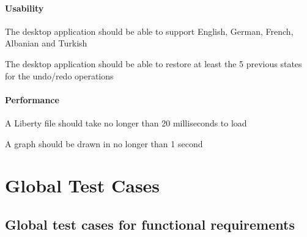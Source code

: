 \documentclass[10pt,a4paper]{report}
\begin{document}
\subsubsection{Usability}
\begin{NFRO-Usability}
    \item The desktop application should be able to support English, German, French, Albanian and Turkish
    \item The desktop application should be able to restore at least the 5 previous states for the undo/redo operations 
\end{NFRO-Usability}

\subsubsection{Performance}
\begin{NFRO-Perf}
    \item A Liberty file should take no longer than 20 milliseconds to load
    \item A graph should be drawn in no longer than 1 second
\end{NFRO-Perf}

\chapter{Global Test Cases}

\section{Global test cases for functional requirements}
\end{document}

